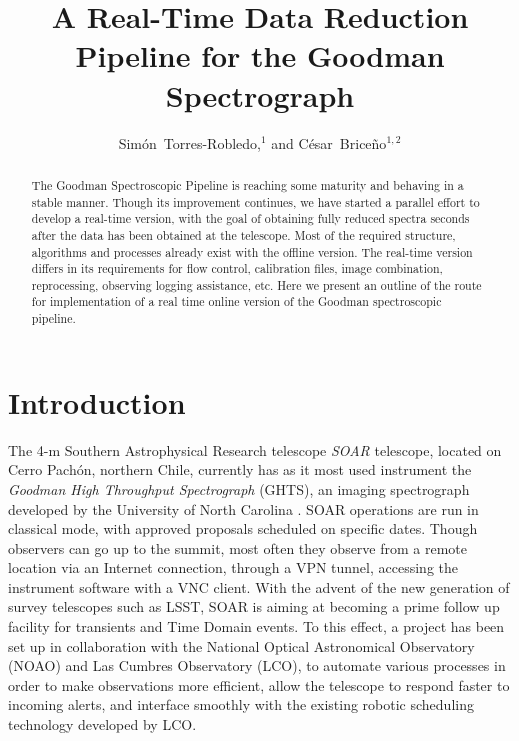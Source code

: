 \documentclass[11pt,twoside]{article}
\begin{document}
\title{A Real-Time Data Reduction Pipeline for the Goodman Spectrograph}


\author{Sim\'on~Torres-Robledo,$^1$ and C\'esar~Brice\~no$^{1,2}$
  }           %



  
\begin{abstract}

The Goodman Spectroscopic Pipeline is reaching some maturity and
behaving in a stable manner. Though its improvement continues, we have
started a parallel effort to develop a real-time version,
with the goal of obtaining fully reduced spectra seconds after the data
has been obtained at the telescope.  Most of the required structure, algorithms and
processes already exist with the offline version. The real-time version differs in its requirements for flow control, calibration files, image combination, reprocessing, observing logging assistance, etc.
Here we present an outline of the route for implementation of a real time online version of the Goodman spectroscopic pipeline.
  
\end{abstract}

\section{Introduction}

The 4-m Southern Astrophysical Research telescope \emph{SOAR} telescope, located on Cerro Pach\'on, northern Chile, currently has as it most used instrument the \emph{Goodman High Throughput Spectrograph} (GHTS), an imaging spectrograph developed by the University of North Carolina \citet{2004SPIE.5492..331C}. SOAR operations are run in classical mode, with approved proposals scheduled on specific dates. Though observers can go up to the summit, most often they observe from a remote location via an Internet connection, through a VPN tunnel, accessing the instrument software with a VNC client. With the advent of the new generation of survey telescopes such as LSST, SOAR is aiming at becoming a prime follow up facility for transients and Time Domain events. To this effect, a project has been set up in collaboration with the National Optical Astronomical Observatory (NOAO) and Las Cumbres Observatory (LCO), to automate various processes in order to make observations more efficient, allow the telescope to respond faster to incoming alerts, and interface smoothly with the existing robotic scheduling technology developed by LCO. 
\end{document}
